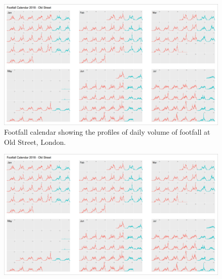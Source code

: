 \cleartoleftpage
{}
\begin{figure}
  \forceversofloat
  \includegraphics[width=172mm,trim={0 0 1310 -42},clip]{images/applications-footfall-calendar.png}
  \caption{Footfall calendar showing the profiles of daily volume of footfall at Old Street, London.}
  \label{}
\end{figure}
\clearpage
\begin{figure}
  \forcerectofloat
  \includegraphics[width=172mm,trim={1315 0 0 0},clip]{images/applications-footfall-calendar.png}
  \caption[]{}
  \label{}
\end{figure}
\restoregeometry
\clearpage

